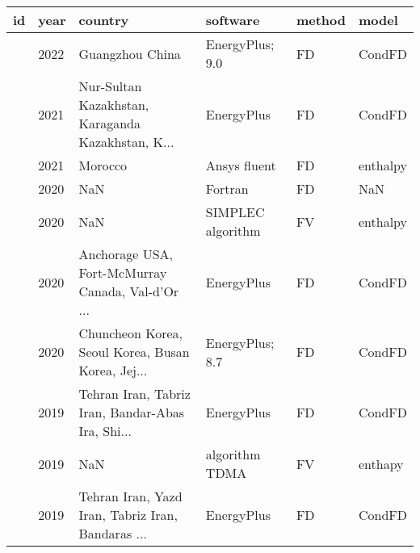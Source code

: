 \begin{tabular}{llllll}
\toprule
                         id & year &                                            country &                        software &                        method &                                  model \\
\midrule
             \cite{Sun2022} & 2022 &                                    Guangzhou China &                 EnergyPlus; 9.0 &                            FD &                                 CondFD \\
     \cite{Adilkhanova2021} & 2021 &  Nur-Sultan Kazakhstan, Karaganda Kazakhstan, K... &                      EnergyPlus &                            FD &                                 CondFD \\
        \cite{Mahdaoui2021} & 2021 &                                            Morocco &                    Ansys fluent &                            FD &                               enthalpy \\
             \cite{Arc2020} & 2020 &                                                NaN &                         Fortran &                            FD &                                    NaN \\
             \cite{Gao2020} & 2020 &                                                NaN &               SIMPLEC algorithm &                            FV &                               enthalpy \\
    \cite{Kenzhekhanov2020} & 2020 &  Anchorage USA, Fort-McMurray Canada, Val-d'Or ... &                      EnergyPlus &                            FD &                                 CondFD \\
             \cite{Yun2020} & 2020 &  Chuncheon Korea, Seoul Korea, Busan Korea, Jej... &                 EnergyPlus; 8.7 &                            FD &                                 CondFD \\
       \cite{Markarian2019} & 2019 &  Tehran Iran, Tabriz Iran, Bandar-Abas Ira, Shi... &                      EnergyPlus &                            FD &                                 CondFD \\
         \cite{ElOuali2019} & 2019 &                                                NaN &                  algorithm TDMA &                            FV &                                enthapy \\
        \cite{Ahangari2019} & 2019 &  Tehran Iran, Yazd Iran, Tabriz Iran, Bandaras ... &                      EnergyPlus &                            FD &                                 CondFD \\

\end{tabular}
